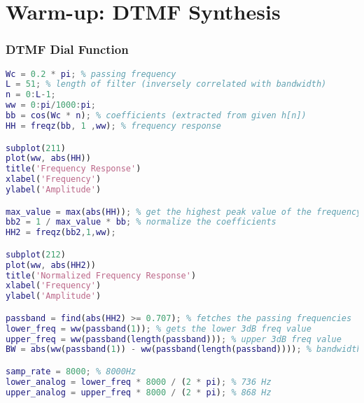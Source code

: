 \section{Warm-up: DTMF Synthesis}
\subsubsection{DTMF Dial Function}



\begin{lstlisting}[language=Matlab]
Wc = 0.2 * pi; % passing frequency
L = 51; % length of filter (inversely correlated with bandwidth)
n = 0:L-1;
ww = 0:pi/1000:pi;
bb = cos(Wc * n); % coefficients (extracted from given h[n])
HH = freqz(bb, 1 ,ww); % frequency response

subplot(211)
plot(ww, abs(HH))
title('Frequency Response')
xlabel('Frequency')
ylabel('Amplitude')

max_value = max(abs(HH)); % get the highest peak value of the frequency response
bb2 = 1 / max_value * bb; % normalize the coefficients
HH2 = freqz(bb2,1,ww);

subplot(212)
plot(ww, abs(HH2))
title('Normalized Frequency Response')
xlabel('Frequency')
ylabel('Amplitude')

passband = find(abs(HH2) >= 0.707); % fetches the passing frequencies
lower_freq = ww(passband(1)); % gets the lower 3dB freq value
upper_freq = ww(passband(length(passband))); % upper 3dB freq value
BW = abs(ww(passband(1)) - ww(passband(length(passband)))); % bandwidth

samp_rate = 8000; % 8000Hz
lower_analog = lower_freq * 8000 / (2 * pi); % 736 Hz
upper_analog = upper_freq * 8000 / (2 * pi); % 868 Hz
\end{lstlisting}
